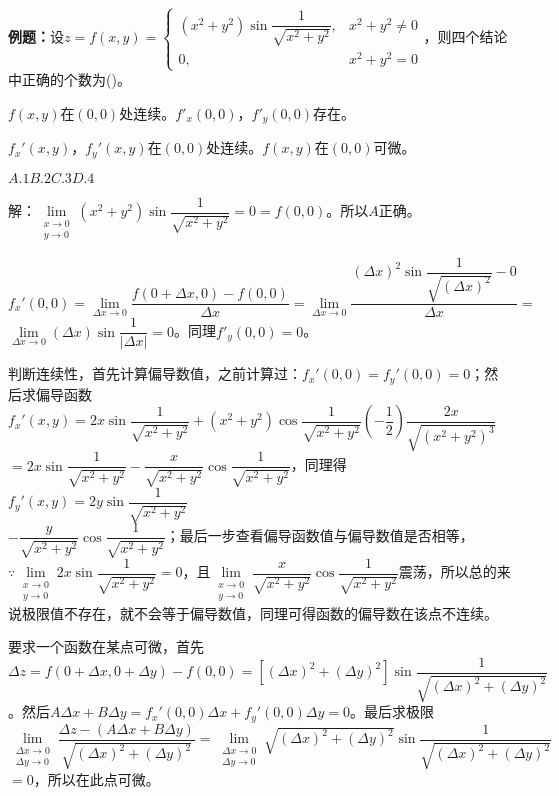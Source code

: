 \textbf{例题：}设$z=f(x,y)=\left\{\begin{array}{ll}
    (x^2+y^2)\sin\dfrac{1}{\sqrt{x^2+y^2}}, & x^2+y^2\neq0 \\
    0, & x^2+y^2=0
\end{array}\right.$，则四个结论中正确的个数为()。

$f(x,y)$在$(0,0)$处连续。\qquad{}$f'_x(0,0)$，$f'_y(0,0)$存在。

$f_x'(x,y)$，$f_y'(x,y)$在$(0,0)$处连续。\qquad{}$f(x,y)$在$(0,0)$可微。

$A.1$\qquad$B.2$\qquad$C.3$\qquad$D.4$

解：$\lim\limits_{\substack{x\to0\\y\to0}}(x^2+y^2)\sin\dfrac{1}{\sqrt{x^2+y^2}}=0=f(0,0)$。所以$A$正确。

$f_x'(0,0)=\lim\limits_{\Delta x\to0}\dfrac{f(0+\Delta x,0)-f(0,0)}{\Delta x}=\lim\limits_{\Delta x\to0}\dfrac{(\Delta x)^2\sin\dfrac{1}{\sqrt{(\Delta x)^2}}-0}{\Delta x}=$\\$\lim\limits_{\Delta x\to0}(\Delta x)\sin\dfrac{1}{\vert\Delta x\vert}=0$。同理$f'_y(0,0)=0$。

判断连续性，首先计算偏导数值，之前计算过：$f_x'(0,0)=f_y'(0,0)=0$；然后求偏导函数$f_x'(x,y)=2x\sin\dfrac{1}{\sqrt{x^2+y^2}}+(x^2+y^2)\cos\dfrac{1}{\sqrt{x^2+y^2}}\left(-\dfrac{1}{2}\right)\dfrac{2x}{\sqrt{(x^2+y^2)^3}}$\\$=2x\sin\dfrac{1}{\sqrt{x^2+y^2}}-\dfrac{x}{\sqrt{x^2+y^2}}\cos\dfrac{1}{\sqrt{x^2+y^2}}$，同理得$f_y'(x,y)=2y\sin\dfrac{1}{\sqrt{x^2+y^2}}$\\$-\dfrac{y}{\sqrt{x^2+y^2}}\cos\dfrac{1}{\sqrt{x^2+y^2}}$；最后一步查看偏导函数值与偏导数值是否相等，$\because\lim\limits_{\substack{x\to0\\y\to0}}2x\sin\dfrac{1}{\sqrt{x^2+y^2}}=0$，且$\lim\limits_{\substack{x\to0\\y\to0}}\dfrac{x}{\sqrt{x^2+y^2}}\cos\dfrac{1}{\sqrt{x^2+y^2}}$震荡，所以总的来说极限值不存在，就不会等于偏导数值，同理可得函数的偏导数在该点不连续。

要求一个函数在某点可微，首先$\Delta z=f(0+\Delta x,0+\Delta y)-f(0,0)=[(\Delta x)^2+(\Delta y)^2]\sin\dfrac{1}{\sqrt{(\Delta x)^2+(\Delta y)^2}}$。然后$A\Delta x+B\Delta y=f_x'(0,0)\Delta x+f_y'(0,0)\Delta y=0$。最后求极限$\lim\limits_{\substack{\Delta x\to0\\\Delta y\to0}}\dfrac{\Delta z-(A\Delta x+B\Delta y)}{\sqrt{(\Delta x)^2+(\Delta y)^2}}=\lim\limits_{\substack{\Delta x\to0\\\Delta y\to0}}\sqrt{(\Delta x)^2+(\Delta y)^2}\sin\dfrac{1}{\sqrt{(\Delta x)^2+(\Delta y)^2}}$\\$=0$，所以在此点可微。


